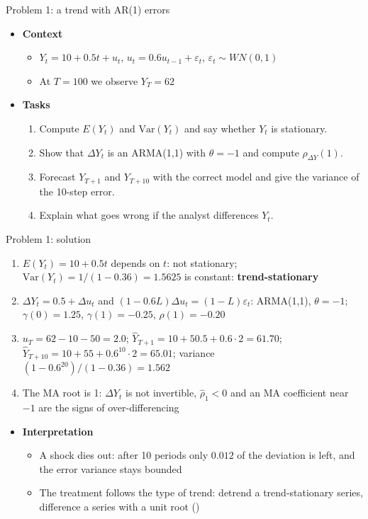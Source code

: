 \begin{frame}{Problem 1: a trend with AR(1) errors}
\itemsize{\footnotesize}
\begin{itemize}
    \item \textbf{Context}
    \begin{itemize}
        \item $Y_t = 10 + 0.5t + u_t$, $u_t = 0.6u_{t-1} + \varepsilon_t$, $\varepsilon_t \sim WN(0, 1)$
        \item At $T = 100$ we observe $Y_T = 62$
    \end{itemize}
    \item \textbf{Tasks}
\begin{enumerate}
    \item Compute $E(Y_t)$ and $\mathrm{Var}(Y_t)$ and say whether $Y_t$ is stationary.
    \item Show that $\Delta Y_t$ is an ARMA(1,1) with $\theta = -1$ and compute $\rho_{\Delta Y}(1)$.
    \item Forecast $Y_{T+1}$ and $Y_{T+10}$ with the correct model and give the variance of the 10-step error.
    \item Explain what goes wrong if the analyst differences $Y_t$.
\end{enumerate}
\end{itemize}
\end{frame}

\begin{frame}{Problem 1: solution}
\itemsize{\footnotesize}
\begin{enumerate}
    \item $E(Y_t) = 10 + 0.5t$ depends on $t$: not stationary; $\mathrm{Var}(Y_t) = 1/(1 - 0.36) = 1.5625$ is constant: \textbf{trend-stationary}
    \item $\Delta Y_t = 0.5 + \Delta u_t$ and $(1 - 0.6L)\Delta u_t = (1 - L)\varepsilon_t$: ARMA(1,1), $\theta = -1$; $\gamma(0) = 1.25$, $\gamma(1) = \ensuremath{-}0.25$, $\rho(1) = \ensuremath{-}0.20$
    \item $u_T = 62 - 10 - 50 = 2.0$; $\hat Y_{T+1} = 10 + 50.5 + 0.6 \cdot 2 = 61.70$; $\hat Y_{T+10} = 10 + 55 + 0.6^{10} \cdot 2 = 65.01$; variance $(1 - 0.6^{20})/(1 - 0.36) = 1.562$
    \item The MA root is 1: $\Delta Y_t$ is not invertible, $\hat\rho_1 < 0$ and an MA coefficient near $-1$ are the signs of over-differencing
\end{enumerate}
\begin{itemize}
    \item \textbf{Interpretation}
    \begin{itemize}
        \item A shock dies out: after 10 periods only $0.012$ of the deviation is left, and the error variance stays bounded
        \item The treatment follows the type of trend: detrend a trend-stationary series, difference a series with a unit root ()
    \end{itemize}
\end{itemize}
\end{frame}

